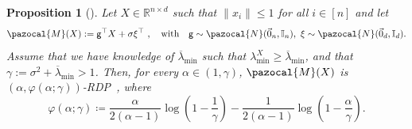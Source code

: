 \documentclass[11pt]{article}
\newtheorem{prop}{Proposition}
\theoremstyle{definition}
\theoremstyle{plain}
\newcommand{\reals}{\mathbb{R}}
\providecommand{\brI}{\mathbb{I}}
\newcommand{\Norm}[1]{\left\| #1 \right\|}
\providecommand{\norm}[1]{\Norm{#1}}
\newcommand{\pM}{\pazocal{M}}
\newcommand{\pN}{\pazocal{N}}
\newcommand{\RDP}{{\normalfont RDP}~}
\begin{document}
\begin{prop}[\citep{lev2025gaussianmix}]
    \label{prop:Privacy_First}
    Let \(X\in\reals^{n\times d}\) such that \(\|x_{i}\| \leq 1\) for all \(i \in [n]\) and let
    \begin{equation}
        \label{eq:base_gauss_mix}
        \pM(X) := \mathsf{g}^{\top}X + \sigma \xi^{\top}~, \quad \text{with} \quad \mathsf{g} \sim \pN(\vec{0}_n, \brI_{n}),~ \xi \sim \pN(\vec{0}_d, \brI_{d}).
    \end{equation}
    Assume that we have knowledge of \(\overline{\lambda}_{\min}\) such that \(\lambda^{X}_{\min} \geq \overline{\lambda}_{\min}\), and that \(\gamma := \sigma^{2} + \overline{\lambda}_{\min} > 1 \).
    Then, for every $\alpha \in (1,\gamma)$, $\pM(X)$ is $(\alpha,\varphi(\alpha;\gamma))$-\RDP, where
    \begin{equation}
    \label{eq:privacy_calib}
        \varphi(\alpha; \gamma) \coloneq \frac{\alpha}{2(\alpha - 1)} \log\left(1 - \frac{1}{\gamma}\right) - \frac{1}{2(\alpha - 1)} \log\left(1 - \frac{\alpha}{\gamma}\right).
    \end{equation}
\end{prop}
\end{document}
